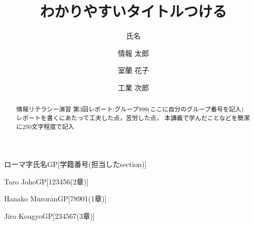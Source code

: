 \documentclass[submit]{literacy}
\begin{document}
\title{ わかりやすいタイトルつける }

\author{氏名}{ローマ字氏名}{GP}[学籍番号(担当したsection)]
\author{情報 太郎}{Taro Joho}{GP}[123456(2章)]
\author{室蘭 花子}{Hanako Muroran}{GP}[78901(1章)]
\author{工業 次郎}{Jiro Kougyo}{GP}[234567(3章)]

\begin{abstract}
情報リテラシー演習 第3回レポート:グループ999(ここに自分のグループ番号を記入)\\

レポートを書くにあたって工夫した点，苦労した点，
本講義で学んだことなどを簡潔に250文字程度で記入
\end{abstract}

\maketitle




\end{document}
